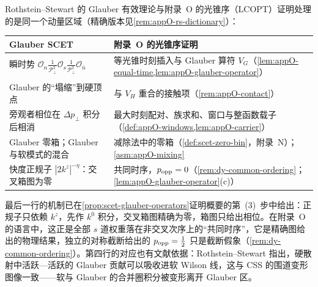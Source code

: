 \begin{remark}\label{rem:scet-glauber-dictionary}
Rothstein--Stewart 的 Glauber 有效理论与附录~O 的光锥序（LCOPT）证明处理的是同一个动量区域（精确版本见\cref{rem:appO-rs-dictionary}）：
\begin{center}\small
\renewcommand{\arraystretch}{1.1}
\begin{tabular}{@{}p{}p{}@{}}
\toprule
Glauber SCET\cite{RothsteinStewart2016} & 附录~O 的光锥序证明 \\
\midrule
瞬时势 $\mathcal O_n\frac{1}{\mathcal P_\perp^2}\mathcal O_s\frac{1}{\mathcal P_\perp^2}\mathcal O_{\bar n}$ & 等光锥时刻插入与 Glauber 算符 $V_G$（\cref{lem:appO-equal-time,lem:appO-glauber-operator}） \\
Glauber 的“塌缩”到硬顶点 & 与 $V_H$ 重合的接触项（\cref{rem:appO-contact}） \\
旁观者相位在 $\Delta p_\perp$ 积分后相消 & 最大时刻配对、族求和、窗口与整函数载子（\cref{def:appO-windows,lem:appO-carrier}） \\
Glauber 零箱；Glauber 与软模式的混合 & 减除法中的零箱（\cref{def:scet-zero-bin}，附录~N）；\cref{asm:appO-mixing} \\
快度正规子 $|2k^z|^{-\eta}$：交叉箱图为零 & 共同时序，$p_{\rm opp}=0$（\cref{rem:dy-common-ordering}；\cref{lem:appO-glauber-operator}(c)） \\
\bottomrule
\end{tabular}
\end{center}
最后一行的机制已在\cref{prop:scet-glauber-operators}证明概要的第~(3)~步中给出：正规子只依赖 $k^z$，先作 $k^0$ 积分，交叉箱图精确为零，箱图只给出相位。在附录~O 的语言中，这正是全部 $s$ 道权重落在非交叉次序上的“共同时序”，它是精确图给出的物理结果，独立的对称截断给出的 $p_{\rm opp}=\frac12$ 只是截断假象（\cref{rem:dy-common-ordering}）。第四行的对应也有文献依据：Rothstein--Stewart 指出，硬散射中活跃—活跃的 Glauber 贡献可以吸收进软 Wilson 线，这与 CSS 的围道变形图像一致——软与 Glauber 的合并圈积分被变形离开 Glauber 区\cite[第~10.1~节]{RothsteinStewart2016}。
\end{remark}
